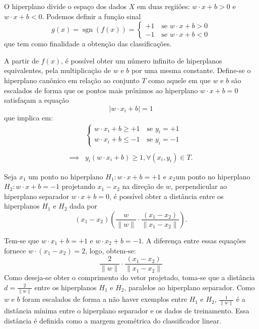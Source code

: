 \documentclass[12pt, a4paper]{article}
\DeclareMathOperator{\sgn}{sgn}
\theoremstyle{plain}
\theoremstyle{definition}
\theoremstyle{remark}
\newcommand{\ident}{\hspace{2em}}
\begin{document}
\ident O hiperplano divide o espaço dos dados $X$ em duas regiiões: $w \cdot x + b > 0$ e $w \cdot x + b < 0$.  Podemos definir a função sinal
\begin{equation*}
    g(x) = \sgn (f(x)) = \begin{cases}
        +1 \quad \text{se} \,\, w \cdot x + b > 0 \\
        -1 \quad \text{se} \,\, w \cdot x + b < 0
    \end{cases}
\end{equation*}
que tem como finalidade a obtenção das classificações. 



\ident A partir de $f(x)$, é possível obter um número infinito de hiperplanos equivalentes, pela multiplicação de $w$ e $b$ por uma mesma constante. Define-se o hiperplano canônico em relação ao conjunto $T$ como aquele em que $w$ e $b$ são escalados de forma que os pontos mais próximos ao hiperplano $w \cdot x + b = 0$ satisfaçam a equação
\begin{equation*}
    \left|w \cdot x_i + b\right| = 1
\end{equation*}
que implica em:
\begin{align*}
    &\begin{cases}
        w \cdot x_i + b \geq +1 \quad \text{se} \,\, y_i = +1 \\
        w \cdot x_i + b \leq -1 \quad \text{se} \,\, y_i = -1
    \end{cases}
    \\\\
    \implies &y_i(w \cdot x_i + b ) \geq 1, \forall(x_i, y_i) \in T.
\end{align*}

\ident Seja $x_1$ um ponto no hiperplano $H_1:w \cdot x + b = +1$ e $x_2 $um ponto no hiperplano $H_2:w \cdot x + b = -1$ projetando $x_1 - x_2$ na direção de $w$,
perpendicular ao hiperplano separador $w \cdot x + b = 0$, é possível obter a distância entre os hiperplanos $H_1$ e $H_2$ dada por
\begin{equation*}
    (x_1 - x_2)\left(\frac{w}{\lVert w \rVert} \cdot \frac{(x_1 - x_2)}{\lVert x_1 - x_2\rVert}\right).
\end{equation*}

\ident Tem-se que $w \cdot x_1 + b = +1$ e $w \cdot x_2 + b = -1$. A diferença entre essas equações fornece $w \cdot (x_1 - x_2) = 2$, logo, obtem-se:
\begin{equation*}
    \frac{2}{\lVert w \rVert} \cdot \frac{(x_1 - x_2)}{\lVert x_1 - x_2\rVert}
\end{equation*}
Como deseja-se obter o comprimento do vetor projetado, toma-se que a distância $d=\frac{2}{\lVert w \rVert}$ entre os hiperplanos $H_1$ e $H_2$, paralelos ao hiperplano separador. Como $w$ e $b$ foram escalados de forma a não haver exemplos entre $H_1$ e $H_2$, $\frac{1}{\lVert w \rVert}$ é a distância mínima entre o hiperplano separador e os dados de treinamento. Essa distância é definida como a margem geométrica do classificador linear.
\end{document}

